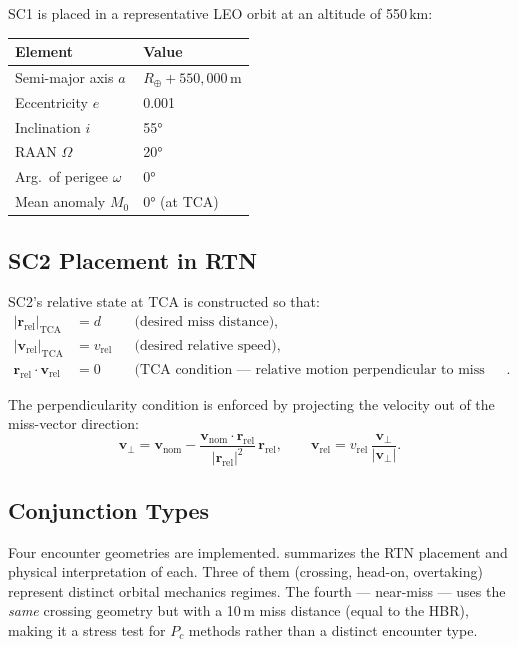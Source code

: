 \documentclass[11pt]{article}
\begin{document}
SC1 is placed in a representative LEO orbit at an altitude of 550\,km:

\begin{center}
\begin{tabular}{ll}
  \toprule
  Element & Value \\
  \midrule
  Semi-major axis $a$ & $R_\oplus + 550{,}000$\,m \\
  Eccentricity $e$ & 0.001 \\
  Inclination $i$ & 55° \\
  RAAN $\Omega$ & 20° \\
  Arg.\ of perigee $\omega$ & 0° \\
  Mean anomaly $M_0$ & 0° (at TCA) \\
  \bottomrule
\end{tabular}
\end{center}

\subsection{SC2 Placement in RTN}

SC2's relative state at TCA is constructed so that:
\begin{align}
  |\mathbf{r}_\text{rel}|_{\text{TCA}} &= d  && \text{(desired miss distance)}, \\
  |\mathbf{v}_\text{rel}|_{\text{TCA}} &= v_\text{rel} && \text{(desired relative speed)}, \\
  \mathbf{r}_\text{rel} \cdot \mathbf{v}_\text{rel} &= 0
  && \text{(TCA condition — relative motion perpendicular to miss vector)}.
\end{align}

The perpendicularity condition is enforced by projecting the velocity out of the
miss-vector direction:
\begin{equation}
  \mathbf{v}_\perp = \mathbf{v}_\text{nom} -
    \frac{\mathbf{v}_\text{nom} \cdot \mathbf{r}_\text{rel}}
         {|\mathbf{r}_\text{rel}|^2}\,\mathbf{r}_\text{rel},
  \qquad
  \mathbf{v}_\text{rel} = v_\text{rel}\,\frac{\mathbf{v}_\perp}{|\mathbf{v}_\perp|}.
\end{equation}

\subsection{Conjunction Types}
\label{sec:ctypes}

Four encounter geometries are implemented.   summarizes the
RTN placement and physical interpretation of each.  Three of them
(crossing, head-on, overtaking) represent distinct orbital mechanics regimes.
The fourth — near-miss — uses the \emph{same} crossing geometry but with a
10\,m miss distance (equal to the HBR), making it a stress test for $P_c$
methods rather than a distinct encounter type.
\end{document}
